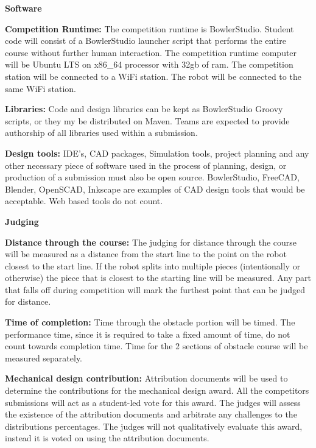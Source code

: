 \documentclass{article}
\begin{document}
 \pagebreak

{\huge \textbf{Software}}

\textbf{Competition Runtime:} The competition runtime is BowlerStudio. Student code will consist of a BowlerStudio launcher script that performs the entire course without further human interaction. The competition runtime computer will be Ubuntu LTS on x86\_64 processor with 32gb of ram. The competition station will be connected to a WiFi station. The robot will be connected to the same WiFi station.  

\textbf{Libraries:} Code and design libraries can be kept as BowlerStudio Groovy scripts, or they my be distributed on Maven. Teams are expected to provide authorship of all libraries used within a submission. 

\textbf{Design tools:} IDE's, CAD packages, Simulation tools, project planning and any other necessary piece of software used in the process of planning, design, or production of a submission must also be open source. BowlerStudio, FreeCAD, Blender, OpenSCAD, Inkscape are examples of CAD design tools that would be acceptable. Web based tools do not count.  


\vspace{1cm}

 \pagebreak

{\huge \textbf{Judging}}

\textbf{Distance through the course:} The judging for distance through the course will be measured as a distance from the start line to the point on the robot closest to the start line. If the robot splits into multiple pieces (intentionally or otherwise) the piece that is closest to the starting line will be measured. Any part that falls off during competition will mark the furthest point that can be judged for distance.  
 	
\textbf{Time of completion:} Time through the obstacle portion will be timed. The performance time, since it is required to take a fixed amount of time, do not count towards completion time. Time for the 2 sections of obstacle course will be measured separately.  
 	
 \textbf{Mechanical design contribution:} Attribution documents will be used to determine the contributions for the mechanical design award. All the competitors submissions will act as a student-led vote for this award. The judges will assess the existence of the  attribution documents and arbitrate any challenges to the distributions percentages. The judges will not qualitatively evaluate this award, instead it is voted on using the attribution documents. 
 	
\end{document}
